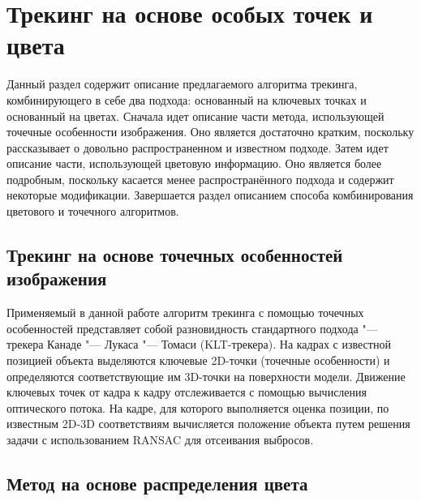 \section{Трекинг на основе особых точек и цвета}\label{tracking}

Данный раздел содержит описание предлагаемого алгоритма трекинга,
комбинирующего в себе два подхода: основанный на ключевых точках
и основанный на цветах.
Сначала идет описание части метода, использующей точечные особенности
изображения.
Оно является достаточно кратким, поскольку рассказывает о довольно
распространенном и известном подходе.
Затем идет описание части, использующей цветовую информацию.
Оно является более подробным, поскольку касается менее распространённого
подхода и содержит некоторые модификации.
Завершается раздел описанием способа комбинирования цветового и точечного
алгоритмов.

\subsection{Трекинг на основе точечных особенностей изображения}
\label{subs:feat_tracking}

Применяемый в данной работе алгоритм трекинга с помощью точечных особенностей
представляет собой разновидность стандартного подхода "--- трекера
Канаде "--- Лукаса "--- Томаси
(KLT-трекера)\cite{LucasAndKanade,TomasiAndKanade,ShiAndTomasi,PyrLK}.
На кадрах с известной позицией объекта выделяются ключевые 2D-точки (точечные
особенности) и определяются соответствующие им 3D-точки на поверхности модели.
Движение ключевых точек от кадра к кадру отслеживается с помощью вычисления
оптического потока.
На кадре, для которого выполняется оценка позиции, по известным 2D-3D
соответствиям вычисляется положение объекта путем решения задачи
\PnP\cite{LepetitSurvey} с использованием RANSAC\cite{RANSAC} для отсеивания
выбросов.


\subsection{Метод на основе распределения цвета}


\newcommand{\Hf}{\ensuremath{H_f}}
\newcommand{\Hb}{\ensuremath{H_b}}
\newcommand{\uvec}{\ensuremath{\vect{u}}}
\newcommand{\hedist}{\ensuremath{\HeX{\CDistX{\uvec}}}}
\newcommand{\HistLocal}{\ensuremath{H_i}}
\newcommand{\HistLocalFg}{\ensuremath{{\Hf}_i}}
\newcommand{\HistLocalBg}{\ensuremath{{\Hb}_i}}

